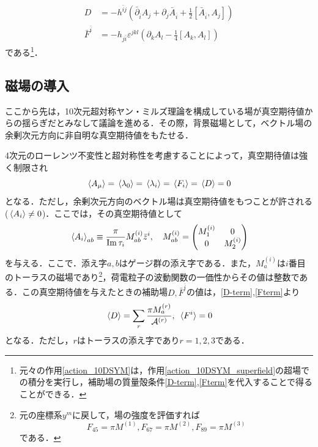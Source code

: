 \documentclass[a4paper,uplatex,dvipdfmx]{jsarticle}
\theoremstyle{definition}
\begin{document}
\begin{align}
   D
   &=
   -
   h^{\bar{i}j}
   \left(  
      \bar{\partial}_{\bar{i}}A_{j}
      +
      \partial_{j}\bar{A}_{\bar{i}}
      +
      \frac{1}{2}[\bar{A}_{\bar{i}},A_{j}]
   \right)
   \label{D-term}
   \\
   \bar{F}^{\bar{i}}
   &=
   -h_{j\bar{i}}
   \varepsilon^{jkl}
   \left(  
      \partial_{k}A_{l}
      -
      \frac{1}{4}[A_{k},A_{l}]
   \right)
   \label{Fterm}
\end{align}
である\footnote{
   元々の作用\eqref{action_10DSYM}は，作用\eqref{action_10DSYM_superfield}の超場での積分を実行し，補助場の質量殻条件\eqref{D-term},\eqref{Fterm}を代入することで得ることができる\cite{Abe_SuperfieldDescription_2012}．
}．


\subsection{磁場の導入}

ここから先は，10次元超対称ヤン・ミルズ理論を構成している場が真空期待値からの揺らぎだとみなして議論を進める．その際，背景磁場として，ベクトル場の余剰次元方向に非自明な真空期待値をもたせる．

4次元のローレンツ不変性と超対称性を考慮することによって，真空期待値は強く制限され
\begin{equation}
   \ev*{A_{\mu}}
   =
   \ev*{\lambda_{0}}
   =
   \ev*{\lambda_{i}}
   =
   \ev*{F_{i}}
   =
   \ev*{D}
   =
   0
   \nonumber
\end{equation}
となる．ただし，余剰次元方向のベクトル場は真空期待値をもつことが許される($\ev*{A_{i}}\neq 0$)．ここでは，その真空期待値として
\begin{equation}
   \ev*{A_{i}}_{ab}
   \equiv
   \frac{\pi}{\Im \tau_{i}} M_{ab}^{(i)}\bar{z}^{i}
   ,\quad
   M_{ab}^{(i)}
   =
   \begin{pmatrix}
     M_{1}^{(i)} & 0 \\
     0 & M_{2}^{(i)}
   \end{pmatrix}   
\end{equation}
を与える．ここで．添え字$a,b$はゲージ群の添え字である．また，$M_{a}^{(i)}$は$i$番目のトーラスの磁場であり\footnote{
   元の座標系$y^{m}$に戻して，場の強度を評価すれば
   $$
      F_{45}=\pi M^{(1)},F_{67}=\pi M^{(2)},F_{89}=\pi M^{(3)}
   $$
   である．
}，荷電粒子の波動関数の一価性からその値は整数である．この真空期待値を与えたときの補助場$D,\bar{F}^{\bar{i}}$の値は，\eqref{D-term},\eqref{Fterm}より
\begin{equation}
   \ev*{D}
   =
   \sum_{r}\frac{\pi M_{a}^{(r)}}{\mathcal{A}^{(r)}}
   ,\ 
   \ev*{F^{i}}
   =
   0
   \label{VEV_D}
\end{equation}
となる．ただし，$r$はトーラスの添え字であり$r=1,2,3$である．
\end{document}
